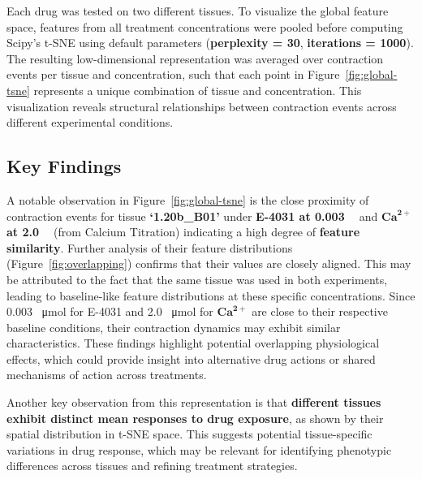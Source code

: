 \documentclass{report}
\begin{document}
        
       Each drug was tested on two different tissues. To visualize the global feature space, features from all treatment concentrations were pooled before computing Scipy's  \cite{scikit-learn} t-SNE using default parameters (\textbf{perplexity = 30}, \textbf{iterations = 1000}). The resulting low-dimensional representation was averaged over contraction events per tissue and concentration, such that each point in Figure~\ref{fig:global-tsne} represents a unique combination of tissue and concentration. This visualization reveals structural relationships between contraction events across different experimental conditions.

    \subsection{Key Findings}
        A notable observation in Figure~\ref{fig:global-tsne} is the close proximity of contraction events for tissue \textbf{`1.20b\_B01'} under \textbf{E-4031 at 0.003 \SI{}{\textbf{\umol}}} and \textbf{$\bm{\text{Ca}^{2+}}$ at 2.0 \SI{}{\textbf{\umol}}} (from Calcium Titration) indicating a high degree of \textbf{feature similarity}. Further analysis of their feature distributions (Figure~\ref{fig:overlapping}) confirms that their values are closely aligned. This may be attributed to the fact that the same tissue was used in both experiments, leading to baseline-like feature distributions at these specific concentrations. Since 0.003  \SI{}{\umol} for E-4031 and 2.0  \SI{}{\umol} for $\bm{\text{Ca}^{2+}}$ are close to their respective baseline conditions, their contraction dynamics may exhibit similar characteristics. These findings highlight potential overlapping physiological effects, which could provide insight into alternative drug actions or shared mechanisms of action across treatments.

        Another key observation from this representation is that \textbf{different tissues exhibit distinct mean responses to drug exposure}, as shown by their spatial distribution in t-SNE space. This suggests potential tissue-specific variations in drug response, which may be relevant for identifying phenotypic differences across tissues and refining treatment strategies.
\end{document}
